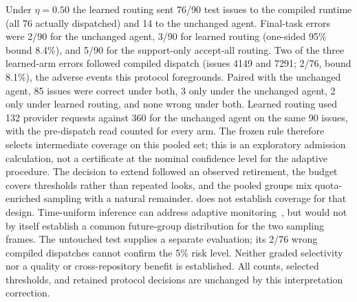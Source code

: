 Under $\eta=0.50$ the learned routing sent 76/90 test issues to the compiled
runtime (all 76 actually dispatched) and 14 to the unchanged agent. Final-task
errors were 2/90 for the unchanged agent, 3/90 for learned routing (one-sided
95\% bound 8.4\%), and 5/90 for the support-only accept-all routing. Two of
the three learned-arm errors followed compiled dispatch (issues 4149 and 7291;
2/76, bound 8.1\%), the adverse events this protocol foregrounds. Paired with
the unchanged agent, 85 issues were correct under both, 3 only under the
unchanged agent, 2 only under learned routing, and none wrong under both.
Learned routing used 132 provider requests against 360 for the unchanged
agent on the same 90 issues, with the pre-dispatch read counted for every arm.
The frozen rule therefore selects intermediate coverage on this pooled set;
this is an exploratory admission calculation, not a certificate at the nominal
confidence level for the adaptive procedure. The decision to extend followed
an observed retirement, the budget covers thresholds rather than repeated
looks, and the pooled groups mix quota-enriched sampling with a natural
remainder.  does not establish coverage for that design.
Time-uniform inference can address adaptive monitoring~\citep{howard2021confidence},
but would not by itself establish a common future-group distribution for the
two sampling frames. The untouched test supplies a separate evaluation;
its 2/76 wrong compiled dispatches cannot confirm the 5\% risk level.
Neither graded selectivity nor a quality or cross-repository benefit is
established. All counts, selected thresholds, and retained protocol decisions
are unchanged by this interpretation correction.

\begin{table}[t]
  \centering
  \caption{Sequential calibration extension of the issue gate: the frozen
  eleven-point sweep on the pooled (184 + 127) and fresh (127) calibration
  groups with accepted groups $n$, task errors $k$, the one-sided
  nominal Clopper--Pearson bound $U$ computed at level $\delta/|\Lambda|$, and
  coverage; $\dagger$ marks rows passing the numerical rule ($U\le 0.05$).
  The registered rule selects the largest passing threshold; nominal coverage
  for the adaptive, mixed-frame procedure is not established.}
  \label{tab:gate-extension}
  \scriptsize
  \setlength{\tabcolsep}{3pt}
  
\end{table}

